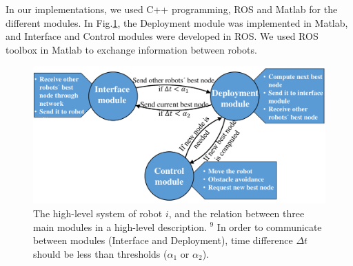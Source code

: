 \documentclass[smallcondensed]{svjour3}
\begin{document}
In our implementations, we used C++ programming, ROS and Matlab for the different modules. In Fig.\ref{fig:state}, the Deployment module was implemented in Matlab, and Interface and Control modules were developed in ROS. We used ROS toolbox in Matlab to exchange information between robots.


%
\begin{figure}[t]
\centering
\includegraphics[width=0.993 \columnwidth]{Figures/Fig10.pdf}
\caption{The high-level system of robot $i$, and the relation between three main modules in a high-level description. {\color{blue}$^9$ In order to communicate between modules (Interface and Deployment), time difference $\Delta t$ should be less than thresholds ($\alpha_1$ or $\alpha_2$).} }
\label{fig:state}
\end{figure}
%
\end{document}
